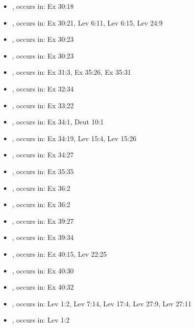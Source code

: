 \documentclass[14pt]{article}
\begin{document}
\begin{itemize}
\item {}, occurs in: Ex 30:18

\item {}, occurs in: Ex 30:21, Lev 6:11, Lev 6:15, Lev 24:9

\item {}, occurs in: Ex 30:23

\item {}, occurs in: Ex 30:23

\item {}, occurs in: Ex 31:3, Ex 35:26, Ex 35:31

\item {}, occurs in: Ex 32:34

\item {}, occurs in: Ex 33:22

\item {}, occurs in: Ex 34:1, Deut 10:1

\item {}, occurs in: Ex 34:19, Lev 15:4, Lev 15:26

\item {}, occurs in: Ex 34:27

\item {}, occurs in: Ex 35:35

\item {}, occurs in: Ex 36:2

\item {}, occurs in: Ex 36:2

\item {}, occurs in: Ex 39:27

\item {}, occurs in: Ex 39:34

\item {}, occurs in: Ex 40:15, Lev 22:25

\item {}, occurs in: Ex 40:30

\item {}, occurs in: Ex 40:32

\item {}, occurs in: Lev 1:2, Lev 7:14, Lev 17:4, Lev 27:9, Lev 27:11

\item {}, occurs in: Lev 1:2


\end{itemize}
\end{document}
